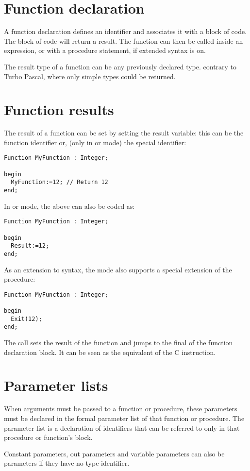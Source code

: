 \section{Function declaration}
A function declaration defines an identifier and associates it with a
block of code. The block of code will return a result.
The function can then be called inside an expression, or with a procedure
statement, if extended syntax is on.

The result type of a function can be any previously declared type.
contrary to Turbo Pascal, where only simple types could be returned.

\section{Function results}
The result of a function can be set by setting the result variable:
this can be the function identifier or, (only in  or  mode) 
the special  identifier:
\begin{verbatim}
Function MyFunction : Integer;

begin
  MyFunction:=12; // Return 12
end;
\end{verbatim}
In  or  mode, the above can also be coded as:
\begin{verbatim}
Function MyFunction : Integer;

begin
  Result:=12;
end;
\end{verbatim}
As an extension to \delphi syntax, the  mode also supports a special
extension of the  procedure:
\begin{verbatim}
Function MyFunction : Integer;

begin
  Exit(12);
end;
\end{verbatim}
The  call sets the result of the function and jumps to the final
 of the function declaration block. It can be seen as the equivalent 
of the C  instruction.

\section{Parameter lists}
\label{se:Parameters}
When arguments must be passed to a function or procedure, these parameters
must be declared in the formal parameter list of that function or procedure.
The parameter list is a declaration of identifiers that can be referred to
only in that procedure or function's block.

Constant parameters, out parameters and variable parameters can also be 
parameters if they have no type
identifier.

